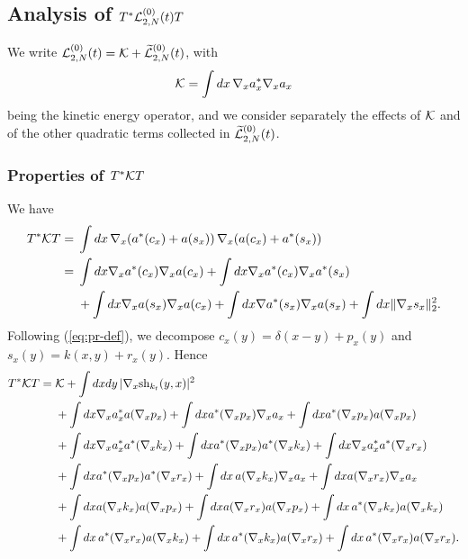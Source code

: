 \documentclass[11pt,a4paper]{article}
\newcommand{\wt}{\widetilde}
\newcommand{\cK}{{\cal K}}
\newcommand{\cL}{{\cal L}}
\begin{document}
\subsection{Analysis of $T^* \cL_{2,N}^{(0)} (t) T$}

We write $\cL_{2,N}^{(0)} (t) = \cK + \wt{\cL}_{2,N}^{(0)} (t)$, with \[ \cK = \int dx \, \nabla_x a^*_x \nabla_x a_x \] being the kinetic energy operator, and we consider separately the effects of $\cK$ 
and of the other quadratic terms collected in $\wt{\cL}_{2,N}^{(0)} (t)$. 

\subsubsection{Properties of $T^* \cK T$}

We have
\[ \begin{split} T^* \cK T = \; & \int dx \, \nabla_x (a^* (c_x) + a(s_x)) \, \nabla_x (a(c_x) + a^* (s_x)) \\
= \; & \int dx \nabla_x a^* (c_x) \nabla_x a(c_x) + \int dx \nabla_x a^* (c_x) \nabla_x a^* (s_x) \\ & + \int dx \nabla_x a(s_x) \nabla_x a(c_x) + \int dx \nabla a^* (s_x) \nabla_x a (s_x) + \int dx  \| \nabla_x s_x \|_2^2.
\end{split} \]
Following (\ref{eq:pr-def}), we decompose  $c_x (y) = \delta (x-y) + p_x (y)$ and $s_x (y) = k (x,y) + r_x (y)$. Hence
\begin{equation}\label{eq:TKT} 
\begin{split} 
T^* \cK T = \; & \cK + \int dx dy \, | \nabla_x \text{sh}_{k_t} (y,x)|^2 \\  & + \int dx \nabla_x a^*_x a (\nabla_x p_x) + \int dx a^* (\nabla_x p_x) \nabla_x a_x + \int dx a^* (\nabla_x p_x) a (\nabla_x p_x)  \\ &+ \int dx \nabla_x a_x^* a^* (\nabla_x k_x)  + \int dx a^* (\nabla_x p_x) a^* (\nabla_x k_x) +  \int dx \nabla_x a_x^* a^* (\nabla_x r_x)  \\ & + \int dx a^* (\nabla_x p_x) a^* (\nabla_x r_x) + \int dx \, a(\nabla_x k_x) \nabla_x a_x + \int dx a(\nabla_x r_x) \nabla_x a_x  \\ & + \int dx a(\nabla_x k_x) a (\nabla_x p_x) + \int dx a(\nabla_x r_x) a(\nabla_x p_x) + \int dx \, a^* (\nabla_x k_x) a (\nabla_x k_x)  \\ & + \int dx \, a^* (\nabla_x r_x) a (\nabla_x k_x) + \int dx \, a^* (\nabla_x k_x) a(\nabla_x r_x) + \int dx \, a^* (\nabla_x r_x) a(\nabla_x r_x). 
\end{split} 
\end{equation}
\end{document}
